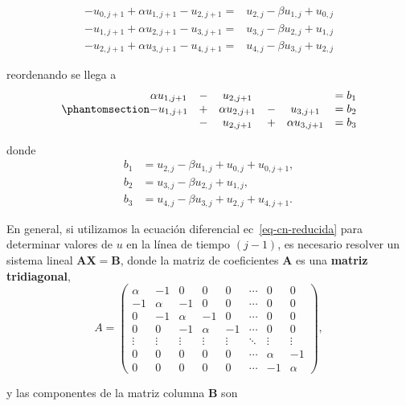 \documentclass[
  spanish,
  us-letterpaper,
]{scrreprt}
\theoremstyle{plain}
\theoremstyle{definition}
\theoremstyle{remark}
\begin{document}
\[
\begin{split}
-u_{0,j+1} + \alpha u_{1,j+1} - u_{2,j+1} =& u_{2,j} - \beta u_{1,j} + u_{0,j} \\
-u_{1,j+1} + \alpha u_{2,j+1} - u_{3,j+1} =& u_{3,j} - \beta u_{2,j} + u_{1,j} \\
-u_{2,j+1} + \alpha u_{3,j+1} - u_{4,j+1} =& u_{4,j} - \beta u_{3,j} + u_{2,j}
\end{split}
\]

reordenando se llega a
\begin{equation}\phantomsection\label{eq-cn-matrix}{
\begin{matrix}
\alpha u_{1,j+1} &-& u_{2,j+1}&& &= b_1 \\
-u_{1,j+1} &+& \alpha u_{2,j+1} &-& u_{3,j+1} &= b_2 \\
&-&u_{2,j+1} &+& \alpha u_{3,j+1} &= b_3
\end{matrix}
}\end{equation}

donde \begin{align*}
b_1 &= u_{2,j} - \beta u_{1,j} + u_{0,j} + u_{0,j+1}, \\
b_2 &= u_{3,j} - \beta u_{2,j} + u_{1,j}, \\
b_3 &= u_{4,j} - \beta u_{3,j} + u_{2,j} + u_{4,j+1}.
\end{align*}

En general, si utilizamos la ecuación diferencial
ec~\ref{eq-cn-reducida} para determinar valores de \(u\) en la línea de
tiempo \((j -1)\), es necesario resolver un sistema lineal
\(\mathbf{AX=B}\), donde la matriz de coeficientes \(\mathbf{A}\) es una
\textbf{matriz tridiagonal}, \[
A = 
\begin{pmatrix}
\alpha & -1    & 0      & 0      & 0      & \cdots & 0 & 0      \\
-1     & \alpha & -1     & 0      & 0      & \cdots & 0 & 0      \\
0      & -1     & \alpha & -1     & 0      & \cdots & 0 & 0      \\
0      & 0      & -1     & \alpha & -1     & \cdots & 0 & 0      \\
\vdots & \vdots & \vdots & \vdots & \vdots & \ddots & \vdots & \vdots \\
0      & 0      & 0      & 0      & 0      & \cdots & \alpha & -1 \\
0      & 0      & 0      & 0      & 0      & \cdots & -1     & \alpha
\end{pmatrix},
\]

y las componentes de la matriz columna \(\mathbf{B}\) son
\end{document}
